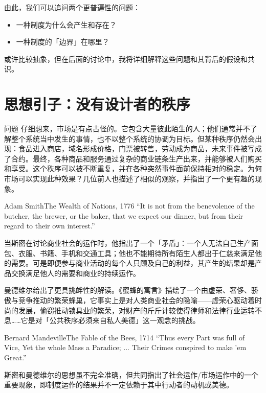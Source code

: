 \documentclass[UTF8,10pt,a4paper,scheme=chinese]{ctexart}
\begin{document}
由此，我们可以追问两个更普遍性的问题：
\begin{itemize}
  \item 一种制度为什么会产生和存在？
  \item 一种制度的「边界」在哪里？
\end{itemize}
或许比较抽象，但在后面的讨论中，我将详细解释这些问题和其背后的假设和共识。

\section{思想引子：没有设计者的秩序}

\begin{keybox}{问题}
仔细想来，市场是有点古怪的。它包含大量彼此陌生的人；他们通常并不了解整个系统当中发生的事情，也不以整个系统的协调为目标。但某种秩序仍然会出现：食品进入商店，域名形成价格，门票被转售，劳动成为商品，未来事件被写成了合约。最终，各种商品和服务通过复杂的商业链条生产出来，并能够被人们购买和享受。这个秩序可以被不断重复，并在各种突然事件面前保持相对的稳定。为何市场可以实现此种效果？几位前人也描述了相似的观察，并指出了一个更有趣的现象。
\end{keybox}

\begin{quotebox}{Adam Smith}{The Wealth of Nations, 1776}
``It is not from the benevolence of the butcher, the brewer, or the baker, that we expect our dinner, but from their regard to their own interest.''
\end{quotebox}

当斯密在讨论商业社会的运作时，他指出了一个「矛盾」：一个人无法自己生产面包、衣服、书籍、手机和交通工具；他也不能期待所有陌生人都出于仁慈来满足他的需要。可是即便参与商业活动的每个人只顾及自己的利益，其产生的结果却是产品交换满足他人的需要和商业的持续运作。

曼德维尔给出了更具挑衅性的解读。《蜜蜂的寓言》描绘了一个由虚荣、奢侈、骄傲与竞争推动的繁荣蜂巢，它事实上是对人类商业社会的隐喻——虚荣心驱动着时尚的发展，偷窃推动锁具业的繁荣，对财产的斤斤计较使得律师和法律行业运转不息……它是对「公共秩序必须来自私人美德」这一观念的挑战。

\begin{quotebox}{Bernard Mandeville}{The Fable of the Bees, 1714}
``Thus every Part was full of Vice, Yet the whole Mass a Paradice; ... Their Crimes conspired to make 'em Great.''
\end{quotebox}

斯密和曼德维尔的思想虽不完全准确，但共同指出了社会运作/市场运作中的一个重要现象，即制度运作的结果并不一定依赖于其中行动者的动机或美德。
\end{document}
